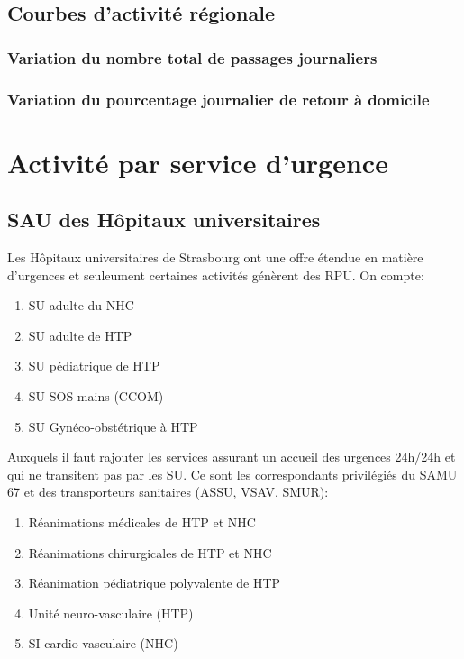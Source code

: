 \documentclass[12pt,english,french]{report}\usepackage{graphicx, color}
\begin{document}
\chapter{Courbes d'activité régionale}
\section*{Variation du nombre total de passages journaliers}
\section*{Variation du pourcentage journalier de retour à domicile}

\part{Activité par service d'urgence}

\chapter{SAU des Hôpitaux universitaires}

Les Hôpitaux universitaires de Strasbourg ont une offre étendue en matière d'urgences et seuleument certaines activités génèrent des RPU.
On compte:
\begin{enumerate}
  \item SU adulte du NHC
  \item SU adulte de HTP
  \item SU pédiatrique de HTP
  \item SU SOS mains (CCOM)
  \item SU Gynéco-obstétrique à HTP
\end{enumerate}
Auxquels il faut rajouter les services assurant un accueil des urgences 24h/24h et qui ne transitent pas par les SU. Ce sont les correspondants privilégiés du SAMU 67 et des transporteurs sanitaires (ASSU, VSAV, SMUR):
\begin{enumerate}
  \item Réanimations médicales de HTP et NHC
  \item Réanimations chirurgicales de HTP et NHC
  \item Réanimation pédiatrique polyvalente de HTP
  \item Unité neuro-vasculaire (HTP)
  \item SI cardio-vasculaire (NHC)
\end{enumerate}
\end{document}
